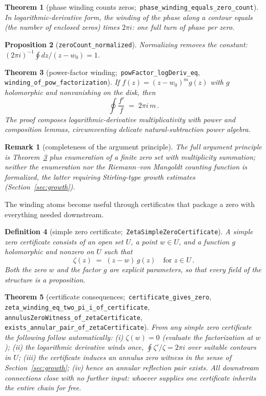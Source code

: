 \documentclass[submission]{jsfds}
\newtheorem{theorem}{Theorem}
\newtheorem{proposition}[theorem]{Proposition}
\newtheorem{definition}[theorem]{Definition}
\newtheorem*{remark}{Remark}
\newcommand{\Lean}[1]{\texttt{#1}}
\begin{document}
\begin{theorem}[phase winding counts zeros;\,
\Lean{phase_winding_equals_zero_count}]\label{thm:phasewind}
In logarithmic-derivative form, the winding of the phase along a contour equals
(the number of enclosed zeros) times $2\pi i$: one full turn of phase per zero.
\end{theorem}

\begin{proposition}[\Lean{zeroCount_normalized}]\label{prop:norm}
Normalizing removes the constant: $(2\pi i)^{-1}\oint dz/(z-w_{0})=1$.
\end{proposition}

\begin{theorem}[power-factor winding;\,
\Lean{powFactor_logDeriv_eq}, \Lean{winding_of_pow_factorization}]
\label{thm:powwind}
If $f(z)=(z-w_{0})^{m}g(z)$ with $g$ holomorphic and nonvanishing on the disk,
then
\[
  \oint \frac{f'}{f} \;=\; 2\pi i\, m\, .
\]
The proof composes logarithmic-derivative multiplicativity with power and
composition lemmas, circumventing delicate natural-subtraction power algebra.
\end{theorem}

\begin{remark}[completeness of the argument principle]
The full argument principle is Theorem~\ref{thm:powwind} plus enumeration of a
finite zero set with multiplicity summation; neither the enumeration nor the
Riemann--von Mangoldt counting function is formalized, the latter requiring
Stirling-type growth estimates (Section~\ref{sec:growth}).
\end{remark}

The winding atoms become useful through certificates that package a zero with
everything needed downstream.

\begin{definition}[simple zero certificate;\,
\Lean{ZetaSimpleZeroCertificate}]\label{def:cert}
A \emph{simple zero certificate} consists of an open set $U$, a point $w\in U$,
and a function $g$ holomorphic and nonzero on $U$ such that
\[
  \zeta(z) \;=\; (z-w)\, g(z) \quad\text{for } z\in U\, .
\]
Both the zero $w$ and the factor $g$ are explicit parameters, so that every
field of the structure is a proposition.
\end{definition}

\begin{theorem}[certificate consequences;\,
\Lean{certificate_gives_zero},
\Lean{zeta_winding_eq_two_pi_i_of_certificate},
\Lean{annulusZeroWitness_of_zetaCertificate},
\Lean{exists_annular_pair_of_zetaCertificate}]\label{thm:certchain}
From any simple zero certificate the following follow automatically:
(i) $\zeta(w)=0$ (evaluate the factorization at $w$);
(ii) the logarithmic derivative winds once,
$\oint\zeta'/\zeta=2\pi i$ over suitable contours in $U$;
(iii) the certificate induces an annulus zero witness in the sense of
Section~\ref{sec:growth};
(iv) hence an annular reflection pair exists.
All downstream connections close with no further input: whoever supplies one
certificate inherits the entire chain for free.
\end{theorem}
\end{document}
